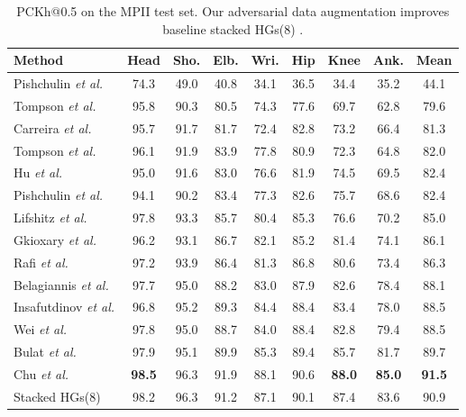 \documentclass[10pt,twocolumn,letterpaper]{article}
\begin{document}
\begin{table}[htb]
\begin{center}
\caption{PCKh@0.5 on the MPII test set. Our adversarial data augmentation improves baseline stacked HGs(8) \cite{newell2016stacked}.}
\label{tb:MPII}
\small
\setlength\tabcolsep{1.5pt}
\begin{tabular}{@{}lcccccccc@{}}
\toprule
Method & Head & Sho. & Elb. & Wri. & Hip & Knee & Ank. & Mean\\
\hline
Pishchulin \textit{et al.}\cite{pishchulin2013strong} & 74.3 & 49.0 & 40.8 & 34.1 & 36.5 & 34.4 & 35.2 & 44.1\\
Tompson \textit{et al.}\cite{tompson2014joint} & 95.8 & 90.3 & 80.5 & 74.3 & 77.6 & 69.7 & 62.8 & 79.6\\
Carreira \textit{et al.}\cite{carreira2016human} & 95.7 & 91.7 & 81.7 & 72.4 & 82.8 & 73.2 & 66.4 & 81.3\\
Tompson \textit{et al.}\cite{tompson2015efficient}& 96.1 & 91.9 & 83.9 & 77.8 & 80.9 & 72.3 & 64.8 & 82.0\\
Hu \textit{et al.}\cite{hu2016bottom}& 95.0 & 91.6 & 83.0 & 76.6 & 81.9 & 74.5 & 69.5 & 82.4\\
Pishchulin \textit{et al.}\cite{pishchulin2016deepcut}&94.1 & 90.2 & 83.4 & 77.3 & 82.6 & 75.7 & 68.6 & 82.4\\
Lifshitz \textit{et al.}\cite{lifshitz2016human} & 97.8 & 93.3 & 85.7 & 80.4 & 85.3 & 76.6 & 70.2 & 85.0\\
Gkioxary \textit{et al.}\cite{gkioxari2016chained} & 96.2 & 93.1 & 86.7 & 82.1 & 85.2 & 81.4 & 74.1 & 86.1\\
Rafi \textit{et al.}\cite{rafi2016efficient} & 97.2 & 93.9 & 86.4 & 81.3 & 86.8 & 80.6 & 73.4 & 86.3\\
Belagiannis \textit{et al.}\cite{belagiannis2017recurrent}&97.7 & 95.0 & 88.2 & 83.0 & 87.9 & 82.6 & 78.4 & 88.1\\
Insafutdinov \textit{et al.}\cite{insafutdinov2016deepercut}&96.8 & 95.2 & 89.3 & 84.4 & 88.4 & 83.4 & 78.0 & 88.5\\
Wei \textit{et al.}\cite{wei2016convolutional} & 97.8 & 95.0 & 88.7 & 84.0 & 88.4 & 82.8 & 79.4 & 88.5\\
Bulat \textit{et al.}\cite{bulat2016human} & 97.9 & 95.1 & 89.9 & 85.3 & 89.4 & 85.7 & 81.7 & 89.7\\
Chu \textit{et al.}\cite{chu2017multi} & {\bf 98.5} & 96.3 & 91.9 & 88.1 & 90.6 & {\bf 88.0} & {\bf 85.0} & {\bf 91.5}\\
\hline
Stacked HGs(8) \cite{newell2016stacked} & 98.2 & 96.3 & 91.2 & 87.1 & 90.1 & 87.4 & 83.6 & 90.9\\

\end{tabular}
\end{center}
\end{table}
\end{document}

